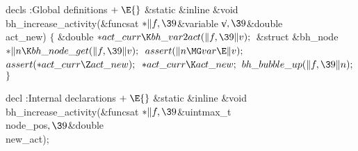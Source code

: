 decls
\Y\B\4:Global definitions\X${}\mathrel+\E{}$\6
\&{static} \&{inline} \&{void} \\{bh\_increase\_activity}(\&{funcsat} ${}{*}%
\|f,\39{}$\&{variable} \|v${},\39{}$\&{double} \\{act\_new})\1\1\2\2\6
${}\{{}$\1\6
\&{double} ${}{*}\\{act\_curr}\K\\{bh\_var2act}(\|f,\39\|v);{}$\6
\&{struct} \&{bh\_node} ${}{*}\|n\K\\{bh\_node\_get}(\|f,\39\|v);{}$\7
${}\\{assert}(\|n\MG\\{var}\E\|v);{}$\6
${}\\{assert}({*}\\{act\_curr}\Z\\{act\_new});{}$\6
${}{*}\\{act\_curr}\K\\{act\_new};{}$\6
${}\\{bh\_bubble\_up}(\|f,\39\|n);{}$\6
\4${}\}{}$\2\par
\fi

decl
\Y\B\4:Internal declarations\X${}\mathrel+\E{}$\6
\&{static} \&{inline} \&{void} \\{bh\_increase\_activity}(\&{funcsat} ${}{*}%
\|f,\39{}$\&{uintmax\_t} \\{node\_pos}${},\39{}$\&{double} \\{new\_act});\par
\fi

